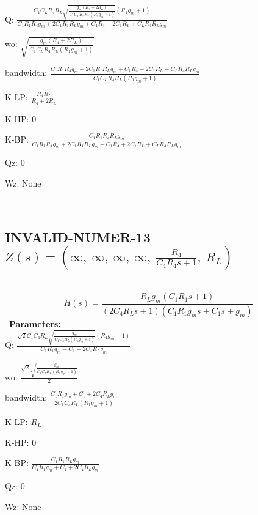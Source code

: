\documentclass{article}
\begin{document}
Q: $\frac{C_{1} C_{L} R_{4} R_{L} \sqrt{\frac{g_{m} \left(R_{4} + 2 R_{L}\right)}{C_{1} C_{L} R_{4} R_{L} \left(R_{1} g_{m} + 1\right)}} \left(R_{1} g_{m} + 1\right)}{C_{1} R_{1} R_{4} g_{m} + 2 C_{1} R_{1} R_{L} g_{m} + C_{1} R_{4} + 2 C_{1} R_{L} + C_{L} R_{4} R_{L} g_{m}}$\ 

wo: $\sqrt{\frac{g_{m} \left(R_{4} + 2 R_{L}\right)}{C_{1} C_{L} R_{4} R_{L} \left(R_{1} g_{m} + 1\right)}}$\ 

bandwidth: $\frac{C_{1} R_{1} R_{4} g_{m} + 2 C_{1} R_{1} R_{L} g_{m} + C_{1} R_{4} + 2 C_{1} R_{L} + C_{L} R_{4} R_{L} g_{m}}{C_{1} C_{L} R_{4} R_{L} \left(R_{1} g_{m} + 1\right)}$\ 

K-LP: $\frac{R_{4} R_{L}}{R_{4} + 2 R_{L}}$\ 

K-HP: $0$\ 

K-BP: $\frac{C_{1} R_{1} R_{4} R_{L} g_{m}}{C_{1} R_{1} R_{4} g_{m} + 2 C_{1} R_{1} R_{L} g_{m} + C_{1} R_{4} + 2 C_{1} R_{L} + C_{L} R_{4} R_{L} g_{m}}$\ 

Qz: $0$\ 

Wz: $\text{None}$\ 

\ 

\subsection{INVALID-NUMER-13 $Z(s) = \left( \infty, \  \infty, \  \infty, \  \infty, \  \frac{R_{4}}{C_{4} R_{4} s + 1}, \  R_{L}\right)$ } \ 
\textbf{\[H(s) = \frac{R_{L} g_{m} \left(C_{1} R_{1} s + 1\right)}{\left(2 C_{4} R_{L} s + 1\right) \left(C_{1} R_{1} g_{m} s + C_{1} s + g_{m}\right)}\] } \ 
\textbf{Parameters:}\\ 

Q: $\frac{\sqrt{2} C_{1} C_{4} R_{L} \sqrt{\frac{g_{m}}{C_{1} C_{4} R_{L} \left(R_{1} g_{m} + 1\right)}} \left(R_{1} g_{m} + 1\right)}{C_{1} R_{1} g_{m} + C_{1} + 2 C_{4} R_{L} g_{m}}$\ 

wo: $\frac{\sqrt{2} \sqrt{\frac{g_{m}}{C_{1} C_{4} R_{L} \left(R_{1} g_{m} + 1\right)}}}{2}$\ 

bandwidth: $\frac{C_{1} R_{1} g_{m} + C_{1} + 2 C_{4} R_{L} g_{m}}{2 C_{1} C_{4} R_{L} \left(R_{1} g_{m} + 1\right)}$\ 

K-LP: $R_{L}$\ 

K-HP: $0$\ 

K-BP: $\frac{C_{1} R_{1} R_{L} g_{m}}{C_{1} R_{1} g_{m} + C_{1} + 2 C_{4} R_{L} g_{m}}$\ 

Qz: $0$\ 

Wz: $\text{None}$\ 
\end{document}
